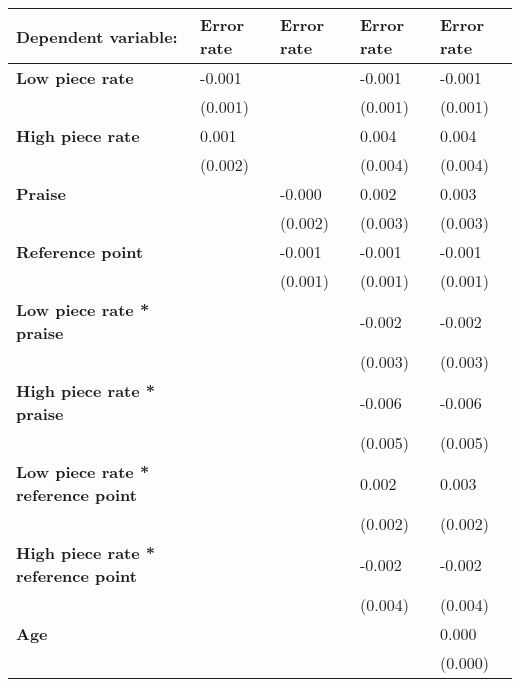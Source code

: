 \begin{tabular}{lllll}
\toprule
\textbf{Dependent variable:} & Error rate & Error rate & Error rate & Error rate \\
\midrule
\textbf{Low piece rate                   } &     -0.001 &            &     -0.001 &     -0.001 \\
                                  &    (0.001) &            &    (0.001) &    (0.001) \\
\textbf{High piece rate                  } &      0.001 &            &      0.004 &      0.004 \\
                                  &    (0.002) &            &    (0.004) &    (0.004) \\
\textbf{Praise                           } &            &     -0.000 &      0.002 &      0.003 \\
                                  &            &    (0.002) &    (0.003) &    (0.003) \\
\textbf{Reference point                  } &            &     -0.001 &     -0.001 &     -0.001 \\
                                  &            &    (0.001) &    (0.001) &    (0.001) \\
\textbf{Low piece rate * praise          } &            &            &     -0.002 &     -0.002 \\
                                  &            &            &    (0.003) &    (0.003) \\
\textbf{High piece rate * praise         } &            &            &     -0.006 &     -0.006 \\
                                  &            &            &    (0.005) &    (0.005) \\
\textbf{Low piece rate * reference point } &            &            &      0.002 &      0.003 \\
                                  &            &            &    (0.002) &    (0.002) \\
\textbf{High piece rate * reference point} &            &            &     -0.002 &     -0.002 \\
                                  &            &            &    (0.004) &    (0.004) \\
\textbf{Age                              } &            &            &            &      0.000 \\
                                  &            &            &            &    (0.000) \\

\end{tabular}
